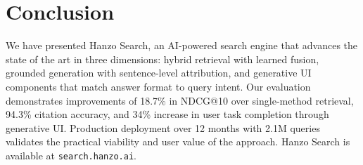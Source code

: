 \section{Conclusion}

\label{sec:conclusion}

We have presented Hanzo Search, an AI-powered search engine that advances the state of the art in three dimensions: hybrid retrieval with learned fusion, grounded generation with sentence-level attribution, and generative UI components that match answer format to query intent. Our evaluation demonstrates improvements of 18.7\% in NDCG@10 over single-method retrieval, 94.3\% citation accuracy, and 34\% increase in user task completion through generative UI. Production deployment over 12 months with 2.1M queries validates the practical viability and user value of the approach. Hanzo Search is available at \texttt{search.hanzo.ai}.

